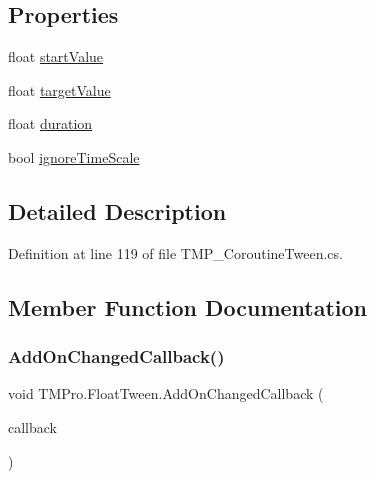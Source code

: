 \subsection*{Properties}
\begin{DoxyCompactItemize}
\item 
float \mbox{\hyperlink{struct_t_m_pro_1_1_float_tween_a5a567005f8103ed38c69863060034a9c}{start\+Value}}
\item 
float \mbox{\hyperlink{struct_t_m_pro_1_1_float_tween_a6f00d7dd7b7d7478c17b424fb779f3e4}{target\+Value}}
\item 
float \mbox{\hyperlink{struct_t_m_pro_1_1_float_tween_a1732506042e018ce35fda4cc017ebb73}{duration}}
\item 
bool \mbox{\hyperlink{struct_t_m_pro_1_1_float_tween_afb7dd396669aef918acda86f74ee2d33}{ignore\+Time\+Scale}}
\end{DoxyCompactItemize}


\subsection{Detailed Description}


Definition at line 119 of file T\+M\+P\+\_\+\+Coroutine\+Tween.\+cs.



\subsection{Member Function Documentation}
\mbox{\label{struct_t_m_pro_1_1_float_tween_ab85f7b9e878c92af531dbb2a84b2fee6}} 
\subsubsection{\texorpdfstring{AddOnChangedCallback()}{AddOnChangedCallback()}}
{\footnotesize\ttfamily void T\+M\+Pro.\+Float\+Tween.\+Add\+On\+Changed\+Callback (\begin{DoxyParamCaption}\item[{Unity\+Action$<$ float $>$}]{callback }\end{DoxyParamCaption})}



